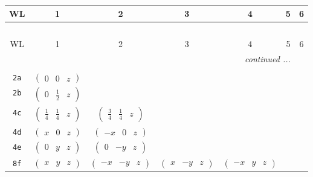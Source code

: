 \documentclass[fleqn,9pt,landscape]{jsarticle}
\begin{document}
\begin{center}
\renewcommand{\arraystretch}{1.2}
\begin{longtable}{ccccccc}
 \hline \hline
WL & 1 & 2 & 3 & 4 & 5 & 6 \\ \hline \endfirsthead

\multicolumn{6}{l}{\tablename\ \thetable{}} \\
 \hline \hline
WL & 1 & 2 & 3 & 4 & 5 & 6 \\ \hline \endhead

 \hline \hline
\multicolumn{6}{r}{\footnotesize\it continued ...} \\ \endfoot

 \hline \hline
\multicolumn{6}{r}{} \\ \endlastfoot

{\tt 2a} & $ \begin{pmatrix} 0 & 0 & z \end{pmatrix} $ & $  $ & $  $ & $  $ \\ \hline
{\tt 2b} & $ \begin{pmatrix} 0 & \frac{1}{2} & z \end{pmatrix} $ & $  $ & $  $ & $  $ \\ \hline
{\tt 4c} & $ \begin{pmatrix} \frac{1}{4} & \frac{1}{4} & z \end{pmatrix} $ & $ \begin{pmatrix} \frac{3}{4} & \frac{1}{4} & z \end{pmatrix} $ & $  $ & $  $ \\ \hline
{\tt 4d} & $ \begin{pmatrix} x & 0 & z \end{pmatrix} $ & $ \begin{pmatrix} - x & 0 & z \end{pmatrix} $ & $  $ & $  $ \\ \hline
{\tt 4e} & $ \begin{pmatrix} 0 & y & z \end{pmatrix} $ & $ \begin{pmatrix} 0 & - y & z \end{pmatrix} $ & $  $ & $  $ \\ \hline
{\tt 8f} & $ \begin{pmatrix} x & y & z \end{pmatrix} $ & $ \begin{pmatrix} - x & - y & z \end{pmatrix} $ & $ \begin{pmatrix} x & - y & z \end{pmatrix} $ & $ \begin{pmatrix} - x & y & z \end{pmatrix} $ \\
\end{longtable}
\end{center}
\end{document}
